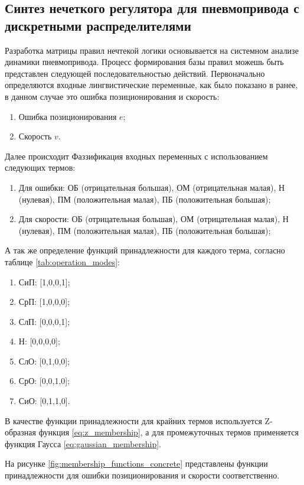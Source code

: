\subsection{Синтез нечеткого регулятора для пневмопривода с дискретными распределителями}\label{subsec:ch3/sec4/sub2}

Разработка матрицы правил нечтекой логики основывается на системном
анализе динамики пневмопривода. Процесс формирования базы правил можешь быть представлен
следующей последовательностью действий.
Первоначально определяются входные лингвистические переменные, как было показано в ранее, в данном случае это ошибка позиционирования и скорость:
\begin{enumerate}
	\item Ошибка позиционирования $e$;
	\item Скорость $v$.
\end{enumerate}

Далее происходит Фаззификация входных переменных с использованием следующих термов:
\begin{enumerate}
	\item Для ошибки: {ОБ (отрицательная большая),
	      ОМ (отрицательная малая),
	      Н (нулевая),
	      ПМ (положительная малая),
	      ПБ (положительная большая)};

	\item Для скорости: {ОБ (отрицательная большая),
	      ОМ (отрицательная малая),
	      Н (нулевая),
	      ПМ (положительная малая),
	      ПБ (положительная большая)};
\end{enumerate}

А так же определение функций принадлежности для каждого терма, согласно таблице
\ref{tab:operation_modes}:
\begin{enumerate}
	\item СиП: [1,0,0,1];
	\item СрП: [1,0,0,0];
	\item СлП: [0,0,0,1]; 
	\item Н: [0,0,0,0];
	\item СлО: [0,1,0,0];
	\item СрО: [0,0,1,0];
	\item СиО: [0,1,1,0].
\end{enumerate}

В качестве функции принадлежности для крайних термов используется Z-образная функция \ref{eq:z_membership},
а для промежуточных термов применяется функция Гаусса \ref{eq:gaussian_membership}.

На рисунке \ref{fig:membership_functions_concrete} представлены функции принадлежности
для ошибки позиционирования и скорости соответственно.

